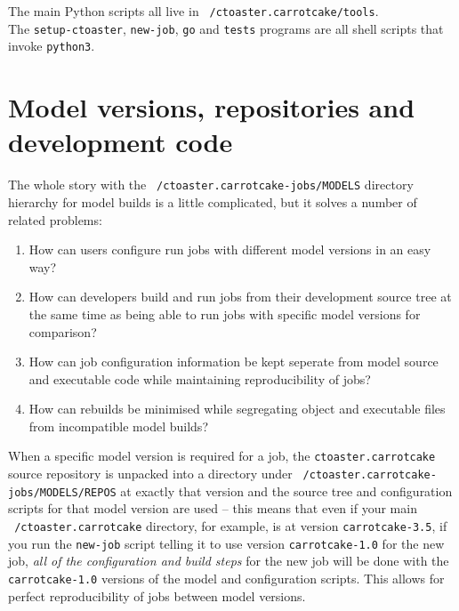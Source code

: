 \documentclass[a4paper,10pt,article]{memoir}
\begin{document}
The main Python scripts all live in \texttt{~/ctoaster.carrotcake/tools}.  
\\The \texttt{setup-ctoaster}, \texttt{new-job}, \texttt{go} and
\texttt{tests} programs are all shell scripts that invoke \texttt{python3}.

\section{Model versions, repositories and development code}

The whole story with the \texttt{~/ctoaster.carrotcake-jobs/MODELS} directory
hierarchy for model builds is a little complicated, but it solves a
number of related problems:
\begin{enumerate}
  \item{How can users configure run jobs with different model versions
    in an easy way?}
  \item{How can developers build and run jobs from their development
    source tree at the same time as being able to run jobs with
    specific model versions for comparison?}
  \item{How can job configuration information be kept seperate from
    model source and executable code while maintaining reproducibility
    of jobs?}
  \item{How can rebuilds be minimised while segregating object and
    executable files from incompatible model builds?}
\end{enumerate}

When a specific model version is required for a job, the
\texttt{ctoaster.carrotcake} source repository is unpacked into a directory under
\texttt{~/ctoaster.carrotcake-jobs/MODELS/REPOS} at exactly that version and the
source tree and configuration scripts for that model version are used
-- this means that even if your main \texttt{~/ctoaster.carrotcake} directory, for
example, is at version \texttt{carrotcake-3.5}, if you run the
\texttt{new-job} script telling it to use version \texttt{carrotcake-1.0}
for the new job, \emph{all of the configuration and build steps} for
the new job will be done with the \texttt{carrotcake-1.0} versions of the
model and configuration scripts.  This allows for perfect
reproducibility of jobs between model versions.
\end{document}
